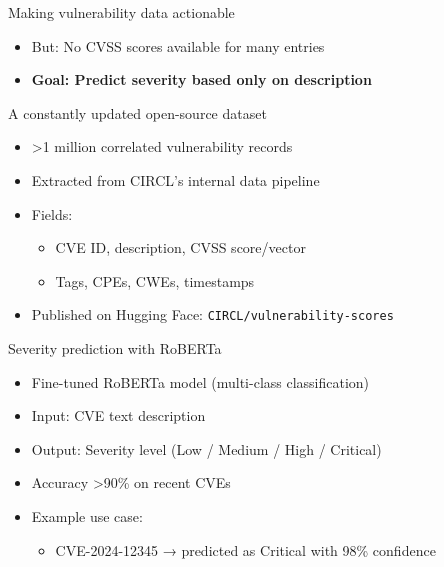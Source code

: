 \documentclass{beamer}
\begin{document}
\begin{frame}{Making vulnerability data actionable}
    \begin{itemize}
        \itemCollaborative features 
            \begin{itemize}
                \item Tags, bundles, and comments
                \item Sightings (real-world observations)
            \end{itemize}
        \item But: No CVSS scores available for many entries
        \item \textbf{Goal: Predict severity based only on description}
    \end{itemize}
\end{frame}

\begin{frame}{A constantly updated open-source dataset}
    \begin{itemize}
        \item >1 million correlated vulnerability records
        \item Extracted from CIRCL's internal data pipeline
        \item Fields:
            \begin{itemize}
                \item CVE ID, description, CVSS score/vector
                \item Tags, CPEs, CWEs, timestamps
            \end{itemize}
        \item Published on Hugging Face: \texttt{CIRCL/vulnerability-scores}
    \end{itemize}
\end{frame}

\begin{frame}{Severity prediction with RoBERTa}
    \begin{itemize}
        \item Fine-tuned RoBERTa model (multi-class classification)
        \item Input: CVE text description
        \item Output: Severity level (Low / Medium / High / Critical)
        \item Accuracy >90\% on recent CVEs
        \item Example use case:
            \begin{itemize}
                \item CVE-2024-12345 → predicted as Critical with 98\% confidence
            \end{itemize}
    \end{itemize}
\end{frame}
\end{document}
